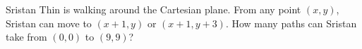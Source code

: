 Sristan Thin is walking around the Cartesian plane. From any point $\left(x,y\right)$, Sristan can move to $\left(x+1,y\right)$ or $\left(x+1,y+3\right)$. How many paths can Sristan take from $\left(0,0\right)$ to $\left(9,9\right)$?